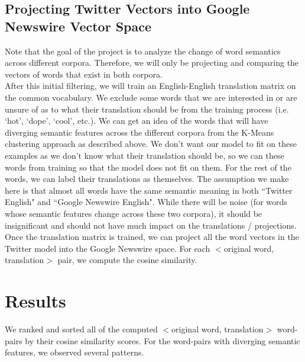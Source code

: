 \documentclass[11pt,a4paper]{article}
\begin{document}
\subsection{Projecting Twitter Vectors into Google Newswire Vector Space}
Note that the goal of the project is to analyze the change of word semantics across different corpora. Therefore, we will only be projecting and comparing the vectors of words that exist in both corpora.\\
After this initial filtering, we will train an English-English translation matrix on the common vocabulary. We exclude some words that we are interested in or are unsure of as to what their translation should be from the training process (i.e. `hot', `dope', `cool', etc.). We can get an idea of the words that will have diverging semantic features across the different corpora from the K-Means clustering approach as described above. We don't want our model to fit on these examples as we don't know what their translation should be, so we can these words from training so that the model does not fit on them. For the rest of the words, we can label their translations as themselves. The assumption we make here is that almost all words have the same semantic meaning in both ``Twitter English" and ``Google Newswire English". While there will be noise (for words whose semantic features change across these two corpora), it should be insignificant and should not have much impact on the translations / projections.\\
Once the translation matrix is trained, we can project all the word vectors in the Twitter model into the Google Newswire space. For each $<$original word, translation$>$ pair, we compute the cosine similarity.

\section{Results}
We ranked and sorted all of the computed $<$original word, translation$>$ word-pairs by their cosine similarity scores. For the word-pairs with diverging semantic features, we observed several patterns.
\end{document}
